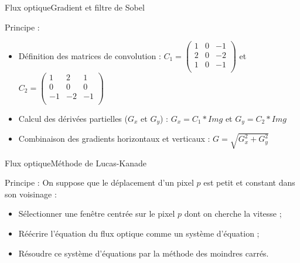 \begin{frame}{Flux optique}{Gradient et filtre de Sobel}

\begin{block}{Principe :}

\begin{itemize}
	\item Définition des matrices de convolution :
	$
		C_1 = \begin{pmatrix}
			1 & 0 & -1 \\
			2 & 0 & -2 \\
			1 & 0 & -1 \\
		\end{pmatrix}
	$
	 et 
	$	
		C_2 = \begin{pmatrix}
			1 & 2 & 1 \\
			0 & 0 & 0 \\
			-1 & -2 & -1 \\
		\end{pmatrix}
	$
	\item Calcul des dérivées partielles ($G_x$ et $G_y$) :
	$
		G_x = C_1 \ast Img
	$
	 et 
	$	
		G_y = C_2 \ast Img
	$
	\item Combinaison des gradients horizontaux et verticaux : $G = \sqrt{G_x^2 + G_y^2}$
\end{itemize}

\end{block}

\end{frame}

\begin{frame}{Flux optique}{Méthode de Lucas-Kanade}

\begin{block}{Principe :}
On suppose que le déplacement d'un pixel $p$ est petit et constant dans son voisinage :
\begin{itemize}
	\item Sélectionner une fenêtre centrée sur le pixel $p$ dont on cherche la vitesse ;
	\item Réécrire l'équation du flux optique comme un système d'équation ;
	\item Résoudre ce système d'équations par la méthode des moindres carrés.
\end{itemize}

\end{block}

\end{frame}

